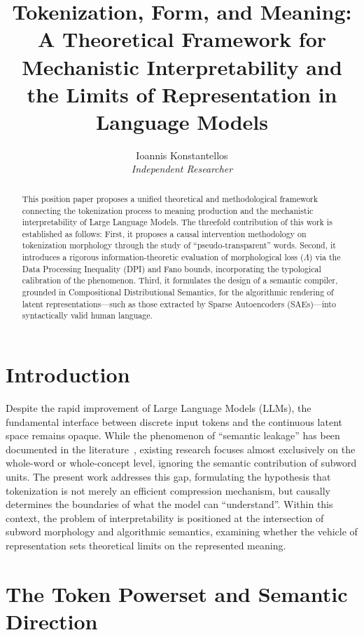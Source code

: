 \documentclass[11pt,a4paper]{article}
\title{\textbf{Tokenization, Form, and Meaning: A Theoretical Framework for\\Mechanistic Interpretability and the Limits of Representation in\\Language Models}}
\author{Ioannis Konstantellos\\[0.3em]\textit{Independent Researcher}}
\date{}
\begin{document}
\maketitle

\begin{abstract}
This position paper proposes a unified theoretical and methodological framework connecting the tokenization process to meaning production and the mechanistic interpretability of Large Language Models. The threefold contribution of this work is established as follows: First, it proposes a causal intervention methodology on tokenization morphology through the study of ``pseudo-transparent'' words. Second, it introduces a rigorous information-theoretic evaluation of morphological loss ($\Lambda$) via the Data Processing Inequality (DPI) and Fano bounds, incorporating the typological calibration of the phenomenon. Third, it formulates the design of a semantic compiler, grounded in Compositional Distributional Semantics, for the algorithmic rendering of latent representations---such as those extracted by Sparse Autoencoders (SAEs)---into syntactically valid human language.
\end{abstract}

\section{Introduction}

Despite the rapid improvement of Large Language Models (LLMs), the fundamental interface between discrete input tokens and the continuous latent space remains opaque. While the phenomenon of ``semantic leakage'' has been documented in the literature~\cite{gonen2025}, existing research focuses almost exclusively on the whole-word or whole-concept level, ignoring the semantic contribution of subword units. The present work addresses this gap, formulating the hypothesis that tokenization is not merely an efficient compression mechanism, but causally determines the boundaries of what the model can ``understand''. Within this context, the problem of interpretability is positioned at the intersection of subword morphology and algorithmic semantics, examining whether the vehicle of representation sets theoretical limits on the represented meaning.

\section{The Token Powerset and Semantic Direction}
\end{document}
